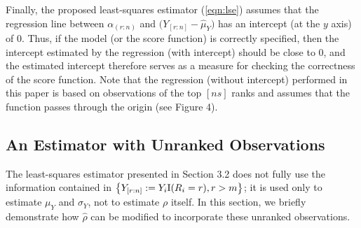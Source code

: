 \documentclass[12pt]{article}
\begin{document}
Finally,  the proposed least-squares estimator (\ref{eqn:lse}) 
assumes that the regression line between $\alpha_{(r:n)}$ and $\big(Y_{[r:n]} - \widehat{\mu}_Y \big)$ 
has an intercept (at the $y$ axis) of $0$. Thus, if the model (or the score function) is correctly 
specified, then the intercept estimated by the regression (with intercept) should be close to $0$, and 
the estimated intercept therefore serves as a measure for checking the correctness of the score function. Note 
that the regression (without intercept) performed in this paper is based on 
observations of the top $[ns]$ ranks and assumes that the function passes through the origin (see Figure 4). 


\subsection{An Estimator with Unranked Observations}
   
The least-squares estimator presented in Section 3.2 does not fully use the information contained in 
$\big\{ Y_{[r:n]}:=Y_i {\rm I}(R_i=r), r >m \big\}$;  
it is used only to estimate $\mu_Y$ and $\sigma_Y$, not to estimate $\rho$ itself. In this section, we briefly
demonstrate how $\widehat{\rho}$ can be modified to incorporate these unranked observations. 
\end{document}

